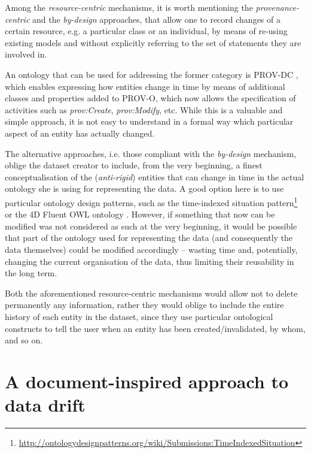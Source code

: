 \documentclass[runningheads,a4paper]{llncs}
\begin{document}
Among the {\em resource-centric} mechanisms, it is worth mentioning the {\em provenance-centric} and the {\em by-design} approaches, that allow one to record changes of a certain resource, e.g. a particular class or an individual, by means of re-using existing models and without explicitly referring to the set of statements they are involved in. 

An ontology that can be used for addressing the former category is PROV-DC  \cite{__RefNumPara__17595_1591320820}, which enables expressing how entities change in time by means of additional classes and properties added to PROV-O, which now allows the specification of activities such as {\em prov:Create}, {\em prov:Modify}, etc. While this is a valuable and simple approach, it is not easy to understand in a formal way which particular aspect of an entity has actually changed.

The alternative approaches, i.e. those compliant with the {\em by-design} mechanism, oblige the dataset creator to include, from the very beginning, a finest conceptualisation of the ({\em anti-rigid}) entities that can change in time in the actual ontology she is using for representing the data. A good option here is to use particular ontology design patterns, such as the time-indexed situation pattern\footnote{\url{http://ontologydesignpatterns.org/wiki/Submissions:TimeIndexedSituation}} or the 4D Fluent OWL ontology  \cite{__RefNumPara__17813_1591320820}. However, if something that now can be modified was not considered as such at the very beginning, it would be possible that part of the ontology used for representing the data (and consequently the data themselves) could be modified accordingly -- wasting time and, potentially, changing the current organisation of the data, thus limiting their reusability in the long term.

Both the aforementioned resource-centric mechanisms would allow not to delete permanently any information, rather they would oblige to include the entire history of each entity in the dataset, since they use particular ontological constructs to tell the user when an entity has been created/invalidated, by whom, and so on.

\section{A document-inspired approach to data drift}\label{__RefHeading__16812_1591320820}
\end{document}
